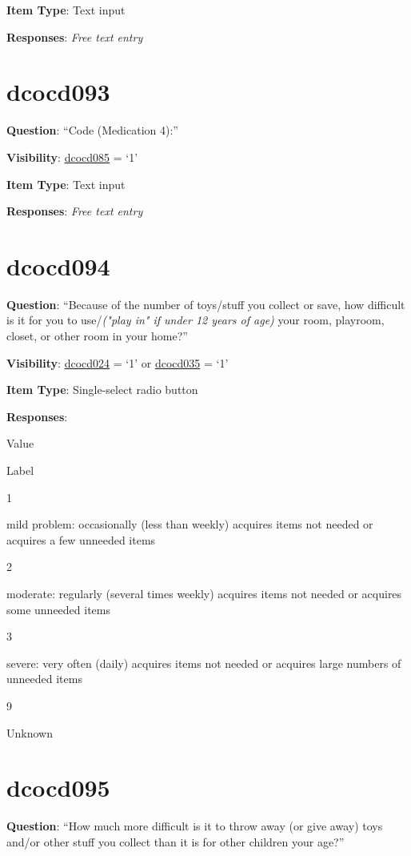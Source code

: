 \documentclass[]{book}
\begin{document}
\textbf{Item Type}: Text input

\textbf{Responses}: \emph{Free text entry}

\hypertarget{dcocd093}{%
\section{dcocd093}\label{dcocd093}}

\textbf{Question}: ``Code (Medication 4):''

\textbf{Visibility}: \protect\hyperlink{dcocd085}{dcocd085} = `1'

\textbf{Item Type}: Text input

\textbf{Responses}: \emph{Free text entry}

\hypertarget{dcocd094}{%
\section{dcocd094}\label{dcocd094}}

\textbf{Question}: ``Because of the number of toys/stuff you collect or save, how difficult is it for you to use/\emph{("play in" if under 12 years of age)} your room, playroom, closet, or other room in your home?''

\textbf{Visibility}: \protect\hyperlink{dcocd024}{dcocd024} = `1' or \protect\hyperlink{dcocd035}{dcocd035} = `1'

\textbf{Item Type}: Single-select radio button

\textbf{Responses}:

Value

Label

1

mild problem: occasionally (less than weekly) acquires items not needed or acquires a few unneeded items

2

moderate: regularly (several times weekly) acquires items not needed or acquires some unneeded items

3

severe: very often (daily) acquires items not needed or acquires large numbers of unneeded items

9

Unknown

\hypertarget{dcocd095}{%
\section{dcocd095}\label{dcocd095}}

\textbf{Question}: ``How much more difficult is it to throw away (or give away) toys and/or other stuff you collect than it is for other children your age?''
\end{document}
